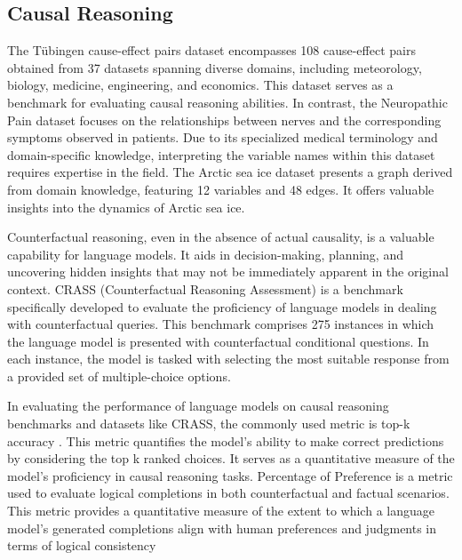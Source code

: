 \subsection{Causal Reasoning}

The T\"{u}bingen cause-effect pairs dataset \citep{Mooij2016} encompasses 108 cause-effect pairs obtained from 37 datasets spanning diverse domains, including meteorology, biology, medicine, engineering, and economics. This dataset serves as a benchmark for evaluating causal reasoning abilities. In contrast, the Neuropathic Pain dataset \citep{Tu2019} focuses on the relationships between nerves and the corresponding symptoms observed in patients. Due to its specialized medical terminology and domain-specific knowledge, interpreting the variable names within this dataset requires expertise in the field. The Arctic sea ice dataset \citep{Huang2021c} presents a graph derived from domain knowledge, featuring 12 variables and 48 edges. It offers valuable insights into the dynamics of Arctic sea ice.

Counterfactual reasoning, even in the absence of actual causality, is a valuable capability for language models. It aids in decision-making, planning, and uncovering hidden insights that may not be immediately apparent in the original context. CRASS (Counterfactual Reasoning Assessment) \citep{Frohberg2021} is a benchmark specifically developed to evaluate the proficiency of language models in dealing with counterfactual queries. This benchmark comprises 275 instances in which the language model is presented with counterfactual conditional questions. In each instance, the model is tasked with selecting the most suitable response from a provided set of multiple-choice options.

In evaluating the performance of language models on causal reasoning benchmarks and datasets like CRASS, the commonly used metric is top-k accuracy \citep{Frohberg2021}. This metric quantifies the model's ability to make correct predictions by considering the top k ranked choices. It serves as a quantitative measure of the model's proficiency in causal reasoning tasks. Percentage of Preference \citep{Li2023g} is a metric used to evaluate logical completions in both counterfactual and factual scenarios. This metric provides a quantitative measure of the extent to which a language model's generated completions align with human preferences and judgments in terms of logical consistency